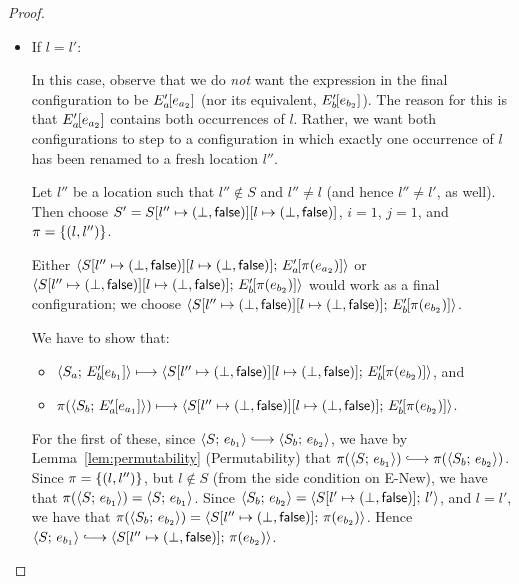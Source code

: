\begin{proof}
\begin{enumerate}
\begin{enumerate}
\begin{itemize}
        \item If $l = l'$:

          In this case, observe that we do \emph{not} want the
          expression in the final configuration to be
          $E'_a\hspace{-1mm}\left[e_{a_2}\right]$ (nor its equivalent,
          $E'_b\hspace{-1mm}\left[e_{b_2}\right]$).  The reason for this is that
          $E'_a\hspace{-1mm}\left[e_{a_2}\right]$ contains both occurrences of $l$.
          Rather, we want both configurations to step to a
          configuration in which exactly one occurrence of $l$ has
          been renamed to a fresh location $l''$.

          Let $l''$ be a location such that $l'' \notin S$ and $l''
          \neq l$ (and hence $l'' \neq l'$, as well).  Then choose $S'
          = S[l'' \mapsto (\bot, \textsf{false})][l \mapsto (\bot, \textsf{false})]$, $i = 1$, $j =
          1$, and $\pi = \left\{(l, l'')\right\}$.

          Either
          $\langle S[l'' \mapsto (\bot, \textsf{false})][l \mapsto (\bot, \textsf{false})];\, E'_a\hspace{-1mm}\left[\pi(e_{a_2})\right] \rangle$
          or
          $\langle S[l'' \mapsto (\bot, \textsf{false})][l \mapsto (\bot, \textsf{false})];\, E'_b\hspace{-1mm}\left[\pi(e_{b_2})\right] \rangle$
          would work as a final configuration; we choose
          $\langle S[l'' \mapsto (\bot, \textsf{false})][l \mapsto (\bot, \textsf{false})];\, E'_b\hspace{-1mm}\left[\pi(e_{b_2})\right] \rangle$.

          We have to show that:
          \begin{itemize}
          \item
            $\langle S_a;\, E'_b\hspace{-1mm}\left[e_{b_1}\right] \rangle \longmapsto
            \langle S[l'' \mapsto (\bot, \textsf{false})][l \mapsto (\bot, \textsf{false})];\, E'_b\hspace{-1mm}\left[\pi(e_{b_2})\right] \rangle$,
            and
          \item
            $\pi(\langle S_b;\, E'_a\hspace{-1mm}\left[e_{a_1}\right] \rangle) \longmapsto
            \langle S[l'' \mapsto (\bot, \textsf{false})][l \mapsto (\bot, \textsf{false})];\, E'_b\hspace{-1mm}\left[\pi(e_{b_2})\right] \rangle$.
          \end{itemize}

          For the first of these, since $\config{S}{e_{b_1}}
          \parstepsto \config{S_b}{e_{b_2}}$, we have by
          Lemma~\ref{lem:permutability} (Permutability) that
          $\pi(\config{S}{e_{b_1}}) \parstepsto
          \pi(\config{S_b}{e_{b_2}})$.  Since $\pi = \left\{(l,
            l'')\right\}$, but $l \notin S$ (from the side condition on {\sc
            E-New}), we have that $\pi(\langle S;\, e_{b_1} \rangle) =
          \langle S;\, e_{b_1} \rangle$. Since $\langle S_b;\, e_{b_2} \rangle =
          \langle S[l' \mapsto (\bot, \textsf{false})];\, l' \rangle$, and $l = l'$, we have
          that $\pi(\langle S_b;\, e_{b_2} \rangle) =
          \langle S[l'' \mapsto (\bot, \textsf{false})];\, \pi(e_{b_2}) \rangle$.  Hence
          $\config{S}{e_{b_1}} \parstepsto
          \config{\extS{S}{l''}{\bot}{\frozenfalse}}{\pi(e_{b_2})}$.


\end{itemize}
\end{enumerate}
\end{enumerate}
\end{proof}
